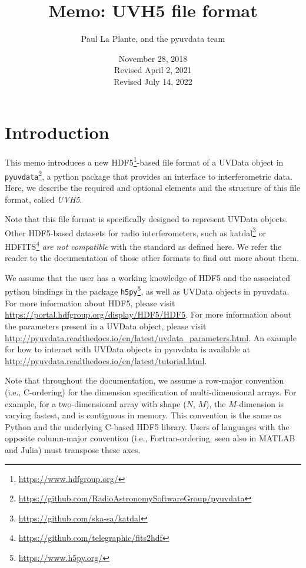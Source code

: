 \documentclass[11pt, oneside]{article}
\title{Memo: UVH5 file format}
\author{Paul La Plante, and the pyuvdata team}
\date{November 28, 2018\\
Revised April 2, 2021\\
Revised July 14, 2022
}
\begin{document}
\maketitle
\tableofcontents
\section{Introduction}
\label{sec:intro}
This memo introduces a new HDF5\footnote{\url{https://www.hdfgroup.org/}}-based
file format of a UVData object in
\verb+pyuvdata+\footnote{\url{https://github.com/RadioAstronomySoftwareGroup/pyuvdata}}, a python
package that provides an interface to interferometric data. Here, we describe
the required and optional elements and the structure of this file format, called
\textit{UVH5}.

Note that this file format is specifically designed to represent UVData
objects. Other HDF5-based datasets for radio interferometers, such as
katdal\footnote{\url{https://github.com/ska-sa/katdal}} or
HDFITS\footnote{\url{https://github.com/telegraphic/fits2hdf}} \textit{are not
  compatible} with the standard as defined here. We refer the reader to the
documentation of those other formats to find out more about them.

We assume that the user has a working knowledge of HDF5 and the associated
python bindings in the package \verb+h5py+\footnote{\url{https://www.h5py.org/}}, as
well as UVData objects in pyuvdata. For more information about HDF5, please
visit \url{https://portal.hdfgroup.org/display/HDF5/HDF5}. For more information
about the parameters present in a UVData object, please visit
\url{http://pyuvdata.readthedocs.io/en/latest/uvdata_parameters.html}. An
example for how to interact with UVData objects in pyuvdata is available at
\url{http://pyuvdata.readthedocs.io/en/latest/tutorial.html}.

Note that throughout the documentation, we assume a row-major convention (i.e.,
C-ordering) for the dimension specification of multi-dimensional arrays. For
example, for a two-dimensional array with shape ($N$, $M$), the $M$-dimension is
varying fastest, and is contiguous in memory. This convention is the same as
Python and the underlying C-based HDF5 library. Users of languages with the
opposite column-major convention (i.e., Fortran-ordering, seen also in MATLAB
and Julia) must transpose these axes.
\end{document}
